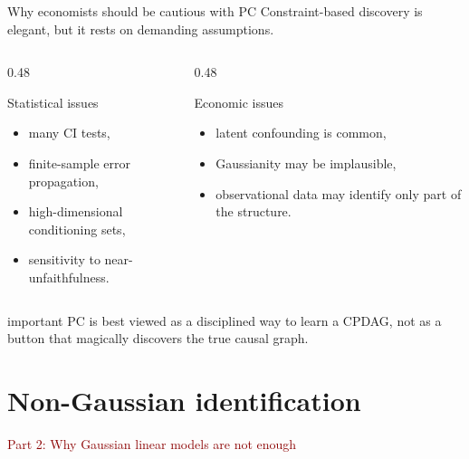 \documentclass[dvipsnames,aspectratio=169,handout]{beamer}
\begin{document}
\begin{frame}{Why economists should be cautious with PC}
Constraint-based discovery is elegant, but it rests on demanding assumptions.

\begin{columns}[T]
\begin{column}{0.48\textwidth}
\begin{block}{Statistical issues}
\begin{itemize}
    \item many CI tests,
    \item finite-sample error propagation,
    \item high-dimensional conditioning sets,
    \item sensitivity to near-unfaithfulness.
\end{itemize}
\end{block}
\end{column}
\begin{column}{0.48\textwidth}
\begin{block}{Economic issues}
\begin{itemize}
    \item latent confounding is common,
    \item Gaussianity may be implausible,
    \item observational data may identify only part of the structure.
\end{itemize}
\end{block}
\end{column}
\end{columns}

\begin{beamercolorbox}[wd=\textwidth,sep=7pt,center,rounded=true,shadow=true]{important}
PC is best viewed as a disciplined way to learn a CPDAG, not as a button that magically discovers the true causal graph.
\end{beamercolorbox}
\end{frame}


\section{Non-Gaussian identification}

\begin{frame}{}
\begin{center}
{\Huge \textcolor{DarkRed}{Part 2: Why Gaussian linear models are not enough}}
\end{center}
\end{frame}
\end{document}
